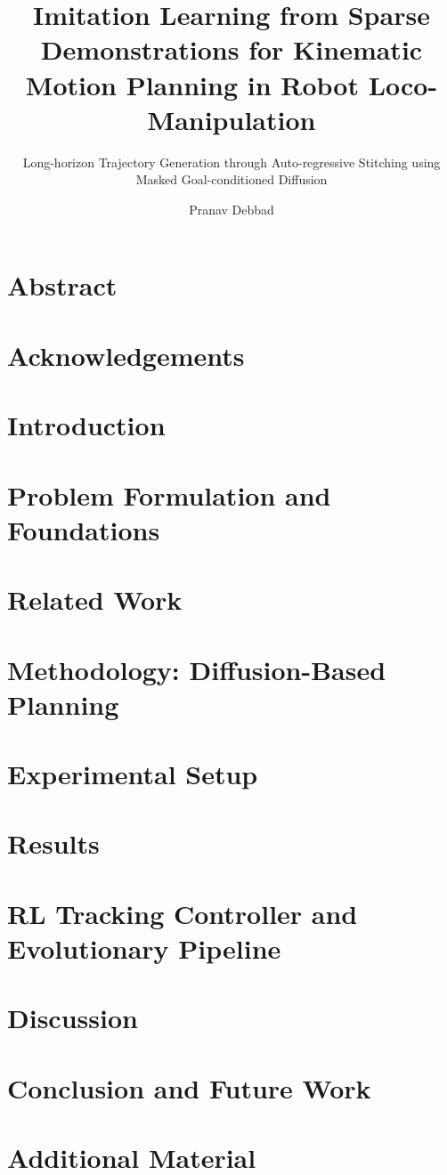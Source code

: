 \documentclass[
  a4paper,            %
  thesis=student,     %
  english,            %
  titlepage=false,    %
  oneside,            %
]{tumbook}
\title{Imitation Learning from Sparse Demonstrations for Kinematic Motion Planning in Robot Loco-Manipulation}
\subtitle{Long-horizon Trajectory Generation through Auto-regressive Stitching using Masked Goal-conditioned Diffusion}
\author{Pranav Debbad}
\begin{document}
\frontmatter
\maketitle
\chapter{Abstract}

\chapter*{Acknowledgements}

\tableofcontents

\listoffigures
\listoftables

\mainmatter
\chapter{Introduction}


\chapter{Problem Formulation and Foundations}


\chapter{Related Work}


\chapter{Methodology: Diffusion-Based Planning}
\label{chap:methodology}


\chapter{Experimental Setup}


\chapter{Results}


\chapter{RL Tracking Controller and Evolutionary Pipeline}
\label{chap:rl_evo}


\chapter{Discussion}


\chapter{Conclusion and Future Work}


\appendix
\chapter{Additional Material}


\backmatter
\nocite{*}


\end{document}
